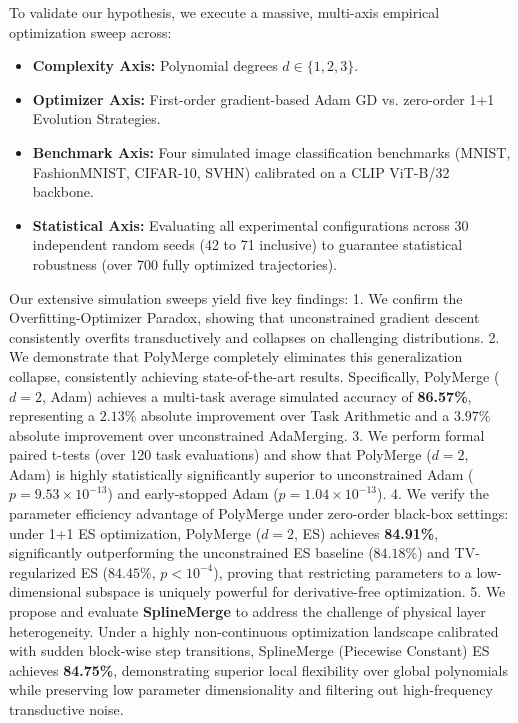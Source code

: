 To validate our hypothesis, we execute a massive, multi-axis empirical optimization sweep across:
\begin{itemize}
    \item \textbf{Complexity Axis:} Polynomial degrees $d \in \{1, 2, 3\}$.
    \item \textbf{Optimizer Axis:} First-order gradient-based Adam GD vs. zero-order 1+1 Evolution Strategies.
    \item \textbf{Benchmark Axis:} Four simulated image classification benchmarks (MNIST, FashionMNIST, CIFAR-10, SVHN) calibrated on a CLIP ViT-B/32 backbone.
    \item \textbf{Statistical Axis:} Evaluating all experimental configurations across 30 independent random seeds (42 to 71 inclusive) to guarantee statistical robustness (over 700 fully optimized trajectories).
\end{itemize}

Our extensive simulation sweeps yield five key findings:
1. We confirm the Overfitting-Optimizer Paradox, showing that unconstrained gradient descent consistently overfits transductively and collapses on challenging distributions.
2. We demonstrate that PolyMerge completely eliminates this generalization collapse, consistently achieving state-of-the-art results. Specifically, PolyMerge ($d=2$, Adam) achieves a multi-task average simulated accuracy of \textbf{86.57\%}, representing a $2.13\%$ absolute improvement over Task Arithmetic and a $3.97\%$ absolute improvement over unconstrained AdaMerging.
3. We perform formal paired t-tests (over 120 task evaluations) and show that PolyMerge ($d=2$, Adam) is highly statistically significantly superior to unconstrained Adam ($p = 9.53 \times 10^{-13}$) and early-stopped Adam ($p = 1.04 \times 10^{-13}$).
4. We verify the parameter efficiency advantage of PolyMerge under zero-order black-box settings: under 1+1 ES optimization, PolyMerge ($d=2$, ES) achieves \textbf{84.91\%}, significantly outperforming the unconstrained ES baseline ($84.18\%$) and TV-regularized ES ($84.45\%$, $p < 10^{-4}$), proving that restricting parameters to a low-dimensional subspace is uniquely powerful for derivative-free optimization.
5. We propose and evaluate \textbf{SplineMerge} to address the challenge of physical layer heterogeneity. Under a highly non-continuous optimization landscape calibrated with sudden block-wise step transitions, SplineMerge (Piecewise Constant) ES achieves \textbf{84.75\%}, demonstrating superior local flexibility over global polynomials while preserving low parameter dimensionality and filtering out high-frequency transductive noise.